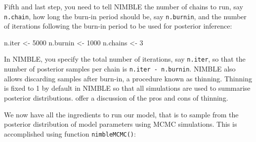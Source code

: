 \documentclass[
  12pt,
]{krantz}
\newenvironment{Shaded}{\begin{snugshade}}{\end{snugshade}}
\newcommand{\DecValTok}[1]{\textcolor[rgb]{0.00,0.00,0.81}{#1}}
\newcommand{\NormalTok}[1]{#1}
\newcommand{\OtherTok}[1]{\textcolor[rgb]{0.56,0.35,0.01}{#1}}
\begin{document}
Fifth and last step, you need to tell NIMBLE the number of chains to run, say \texttt{n.chain}, how long the burn-in period should be, say \texttt{n.burnin}, and the number of iterations following the burn-in period to be used for posterior inference:

\begin{Shaded}
\begin{Highlighting}[]
\NormalTok{n.iter }\OtherTok{\textless{}{-}} \DecValTok{5000}
\NormalTok{n.burnin }\OtherTok{\textless{}{-}} \DecValTok{1000}
\NormalTok{n.chains }\OtherTok{\textless{}{-}} \DecValTok{3}
\end{Highlighting}
\end{Shaded}

In NIMBLE, you specify the total number of iterations, say \texttt{n.iter}, so that the number of posterior samples per chain is \texttt{n.iter\ -\ n.burnin}. NIMBLE also allows discarding samples after burn-in, a procedure known as thinning. Thinning is fixed to 1 by default in NIMBLE so that all simulations are used to summarise posterior distributions. \citet{link2012thinning} offer a discussion of the pros and cons of thinning.

We now have all the ingredients to run our model, that is to sample from the posterior distribution of model parameters using MCMC simulations. This is accomplished using function \texttt{nimbleMCMC()}:
\end{document}
